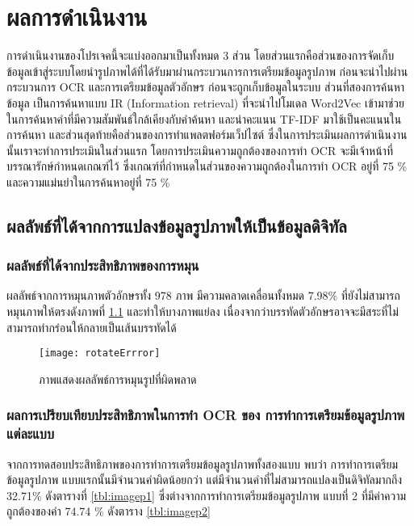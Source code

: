 \chapter{ผลการดำเนินงาน}

การดำเนินงานของโปรเจคนี้จะแบ่งออกมาเป็นทั้งหมด 3 ส่วน โดยส่วนแรกคือส่วนของการจัดเก็บข้อมูลเข้าสู่ระบบโดยนำรูปภาพได้ที่ได้รับมาผ่านกระบวนการการเตรียมข้อมูลรูปภาพ 
ก่อนจะนำไปผ่านกระบวนการ OCR และการเตรียมข้อมูลตัวอักษร ก่อนจะถูกเก็บข้อมูลในระบบ ส่วนที่สองการค้นหาข้อมูล เป็นการค้นหาแบบ IR (Information retrieval) 
ที่จะนำไปโมเดล Word2Vec เข้ามาช่วยในการค้นหาคำที่มีความสัมพันธ์ใกล้เคียงกับคำค้นหา และนำคะแนน TF-IDF มาใช้เป็นคะแนนในการค้นหา และส่วนสุดท้ายคือส่วนของการทำแพลตฟอร์มเว็ปไซต์
ซึ่งในการประเมินผลการดำเนินงานนั้นเราจะทำการประเมินในส่วนแรก โดยการประเมินความถูกต้องของการทำ OCR จะมีเจ้าหน้าที่บรรณารักษ์กำหนดเกณฑ์ไว้ 
ซึ่งเกณฑ์ที่กำหนดในส่วนของความถูกต้องในการทำ OCR อยู่ที่ 75 \% และความแม่นยำในการค้นหาอยู่ที่ 75 \%

\section{ผลลัพธ์ที่ได้จากการแปลงข้อมูลรูปภาพให้เป็นข้อมูลดิจิทัล}

\subsection{ผลลัพธ์ที่ได้จากประสิทธิภาพของการหมุน}
ผลลัพธ์จากการหมุนภาพตัวอักษรทั้ง 978 ภาพ มีความคลาดเคลื่อนทั้งหมด 7.98\% ที่ยังไม่สามารถหมุนภาพให้ตรงดังภาพที่ \ref{fig:rotateErrror} 
และทำให้บางภาพแย่ลง เนื่องจากว่าบรรทัดตัวอักษรอาจจะมีสระที่ไม่สามารถทำกร่อนให้กลายเป็นเส้นบรรทัดได้

\begin{figure}[H]
    \centering
    \texttt{[image: rotateErrror]}
    \caption{ภาพแสดงผลลัพธ์การหมุนรูปที่ผิดพลาด}\label{fig:rotateErrror}
\end{figure}

\subsection{ผลการเปรียบเทียบประสิทธิภาพในการทำ OCR ของ การทำการเตรียมข้อมูลรูปภาพ แต่ละแบบ}

จากการทดสอบประสิทธิภาพของการทำการเตรียมข้อมูลรูปภาพทั้งสองแบบ พบว่า 
การทำการเตรียมข้อมูลรูปภาพ แบบแรกนั้นมีจำนวนคำผิดน้อยกว่า แต่มีจำนวนคำที่ไม่สามารถแปลงเป็นดิจิทัลมากถึง 
32.71\% ดังตารางที่ \ref{tbl:imagep1} ซึ่งต่างจากการทำการเตรียมข้อมูลรูปภาพ แบบที่ 2 ที่มีค่าความถูกต้องของคำ 
74.74 \% ดังตาราง \ref{tbl:imagep2}

